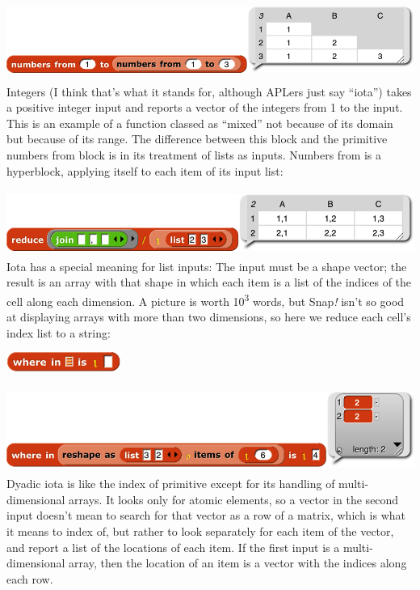 \includegraphics[width=6.34167in,height=1.04167in]{media/image1282.png}Integers
(I think that's what it stands for, although APLers just say ``iota'')
takes a positive integer input and reports a vector of the integers from
1 to the input. This is an example of a function classed as ``mixed''
not because of its domain but because of its range. The difference
between this block and the primitive numbers from block is in its
treatment of lists as inputs. Numbers from is a hyperblock, applying
itself to each item of its input list:

\includegraphics[width=6.025in,height=0.83333in]{media/image1283.png}Iota
has a special meaning for list inputs: The input must be a shape vector;
the result is an array with that shape in which each item is a list of
the indices of the cell along each dimension. A picture is worth
10\textsuperscript{3} words, but Snap\emph{!} isn't so good at
displaying arrays with more than two dimensions, so here we reduce each
cell's index list to a string:

\includegraphics[width=1.475in,height=0.25in]{media/image1284.png}

\includegraphics[width=5.95in,height=1.1in]{media/image1285.png}Dyadic
iota is like the index of primitive except for its handling of
multi-dimensional arrays. It looks only for atomic elements, so a vector
in the second input doesn't mean to search for that vector as a row of a
matrix, which is what it means to index of, but rather to look
separately for each item of the vector, and report a list of the
locations of each item. If the first input is a multi-dimensional array,
then the location of an item is a vector with the indices along each
row.

